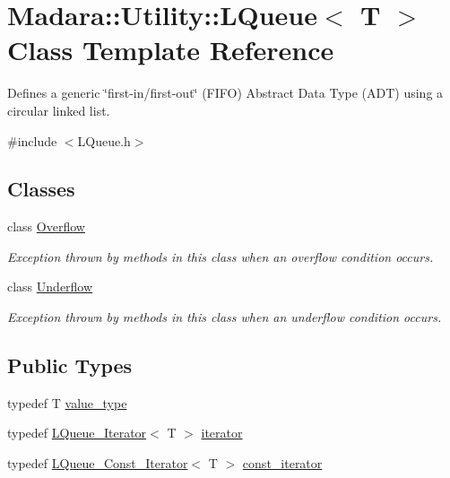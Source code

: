 \hypertarget{classMadara_1_1Utility_1_1LQueue}{
\section{Madara::Utility::LQueue$<$ T $>$ Class Template Reference}
\label{d7/df8/classMadara_1_1Utility_1_1LQueue}
}


Defines a generic \char`\"{}first-\/in/first-\/out\char`\"{} (FIFO) Abstract Data Type (ADT) using a circular linked list.  




{\ttfamily \#include $<$LQueue.h$>$}

\subsection*{Classes}
\begin{DoxyCompactItemize}
\item 
class \hyperlink{classMadara_1_1Utility_1_1LQueue_1_1Overflow}{Overflow}
\begin{DoxyCompactList}\small\item\em Exception thrown by methods in this class when an overflow condition occurs. \item\end{DoxyCompactList}\item 
class \hyperlink{classMadara_1_1Utility_1_1LQueue_1_1Underflow}{Underflow}
\begin{DoxyCompactList}\small\item\em Exception thrown by methods in this class when an underflow condition occurs. \item\end{DoxyCompactList}\end{DoxyCompactItemize}
\subsection*{Public Types}
\begin{DoxyCompactItemize}
\item 
typedef T \hyperlink{classMadara_1_1Utility_1_1LQueue_ae8a77794c76db8225abdfc1685ea0f9d}{value\_\-type}
\item 
typedef \hyperlink{classMadara_1_1Utility_1_1LQueue__Iterator}{LQueue\_\-Iterator}$<$ T $>$ \hyperlink{classMadara_1_1Utility_1_1LQueue_ae81897923a220c04feeea57192cf57bc}{iterator}
\item 
typedef \hyperlink{classMadara_1_1Utility_1_1LQueue__Const__Iterator}{LQueue\_\-Const\_\-Iterator}$<$ T $>$ \hyperlink{classMadara_1_1Utility_1_1LQueue_a716f1eb90f4f16f4a6df486e8613952c}{const\_\-iterator}
\end{DoxyCompactItemize}
